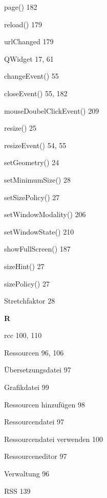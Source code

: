 \documentclass{book}
\renewcommand\indexspace{\vspace{11pt}}
\renewcommand\subitem{\par}
\begin{document}
\begin{multicols}{2}
\begin{osp-index}
    \subitem page()\hspace{1mm} 182
    \subitem reload()\hspace{1mm} 179
    \subitem urlChanged\hspace{1mm} 179
  \item QWidget\hspace{1mm} 17, 61
    \subitem changeEvent()\hspace{1mm} 55
    \subitem closeEvent()\hspace{1mm} 55, 182
    \subitem mouseDoubelClickEvent()\hspace{1mm} 209
    \subitem resize()\hspace{1mm} 25
    \subitem resizeEvent()\hspace{1mm} 54, 55
    \subitem setGeometry()\hspace{1mm} 24
    \subitem setMinimumSize()\hspace{1mm} 28
    \subitem setSizePolicy()\hspace{1mm} 27
    \subitem setWindowModality()\hspace{1mm} 206
    \subitem setWindowState()\hspace{1mm} 210
    \subitem showFullScreen()\hspace{1mm} 187
    \subitem sizeHint()\hspace{1mm} 27
    \subitem sizePolicy()\hspace{1mm} 27
    \subitem Stretchfaktor\hspace{1mm} 28

  \indexspace
{\sffamily\bfseries R}\nopagebreak

  \item rcc\hspace{1mm} 100, 110
  \item Ressourcen\hspace{1mm} 96, 106
    \subitem \"Ubersetzungsdatei\hspace{1mm} 97
    \subitem Grafikdatei\hspace{1mm} 99
    \subitem Ressourcen hinzuf\"ugen\hspace{1mm} 98
    \subitem Ressourcendatei\hspace{1mm} 97
    \subitem Ressourcendatei verwenden\hspace{1mm} 100
    \subitem Ressourceneditor\hspace{1mm} 97
    \subitem Verwaltung\hspace{1mm} 96
  \item RSS\hspace{1mm} 139


\end{osp-index}
\end{multicols}
\end{document}
